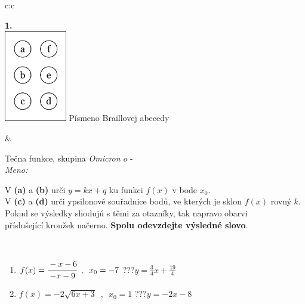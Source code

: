 \documentclass[10pt]{report}
\newcommand\omicron{o}
\begin{document}
\begin{tabular}{c:c}
\begin{minipage}[c][104.5mm][t]{0.5\linewidth}
\begin{center}
\begin{minipage}{0.20\linewidth}
\begin{center}
{\Huge\bfseries 1.} \\[2mm]
\includegraphics[height=40mm]{../images/braille.png}
{\small Písmeno Braillovej abecedy}
\end{center}
\end{minipage}
\end{center}
\end{minipage}
&
\begin{minipage}[c][104.5mm][t]{0.5\linewidth}
\begin{center}
\vspace{7mm}
{\huge Tečna funkce, skupina \textit{Omicron $\omicron$} -}\\[5mm]
\textit{Meno:}\phantom{xxxxxxxxxxxxxxxxxxxxxxxxxxxxxxxxxxxxxxxxxxxxxxxxxxxxxxxxxxxxxxxxx}\\[5mm]
\begin{minipage}{0.95\linewidth}
\begin{center}
V \textbf{(a)} a \textbf{(b)} urči  $y = kx + q$ ku funkci $f(x)$ v bode $x_0$.\\V \textbf{(c)} a \textbf{(d)} urči ypsilonové souřadnice bodů, ve kterých je sklon $f(x)$ rovný $k$.\\Pokud se výsledky shodujú s těmi za otazníky, tak napravo obarvi\\příslušející kroužek načerno. \textbf{Spolu odevzdejte výsledné slovo}.
\end{center}
\end{minipage}
\\[1mm]
\begin{minipage}{0.79\linewidth}
\begin{center}
\begin{varwidth}{\linewidth}
\begin{enumerate}
\small
\item $f(x)=\cfrac{-x-6}{-x-9}\enspace , \enspace x_0=-7$\quad \dotfill\; ???\;\dotfill \quad $y = \frac{3}{4}x+\frac{19}{4}$
\item $f(x)=-2\sqrt{6x+3}\enspace , \enspace x_0=1$\quad \dotfill\; ???\;\dotfill \quad $y = -2x-8$

\end{enumerate}
\end{varwidth}
\end{center}
\end{minipage}
\end{center}
\end{minipage}
\end{tabular}
\end{document}
